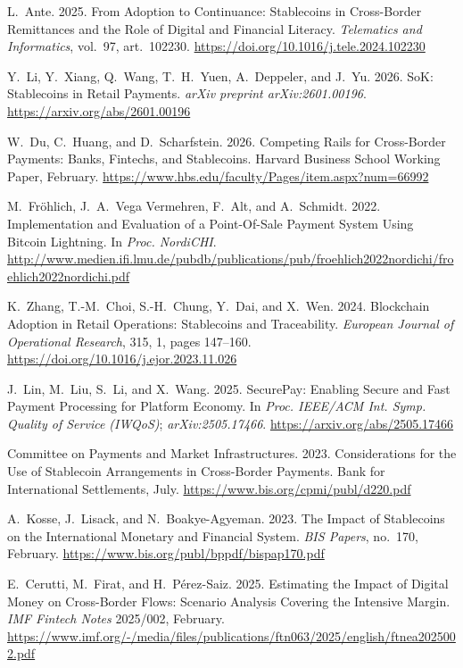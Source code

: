 \documentclass[12pt,a4paper]{report}
\begin{document}
{\begin{enumerate}[label={[\arabic*]}]
\item L.~Ante. 2025. From Adoption to Continuance: Stablecoins in Cross-Border Remittances and the Role of Digital and Financial Literacy. \emph{Telematics and Informatics}, vol.~97, art.~102230. \url{https://doi.org/10.1016/j.tele.2024.102230}


\item Y.~Li, Y.~Xiang, Q.~Wang, T.~H.~Yuen, A.~Deppeler, and J.~Yu. 2026. SoK: Stablecoins in Retail Payments. \emph{arXiv preprint arXiv:2601.00196}. \url{https://arxiv.org/abs/2601.00196}


\item W.~Du, C.~Huang, and D.~Scharfstein. 2026. Competing Rails for Cross-Border Payments: Banks, Fintechs, and Stablecoins. Harvard Business School Working Paper, February. \url{https://www.hbs.edu/faculty/Pages/item.aspx?num=66992}


\item M.~Fr\"{o}hlich, J.~A.~Vega Vermehren, F.~Alt, and A.~Schmidt. 2022. Implementation and Evaluation of a Point-Of-Sale Payment System Using Bitcoin Lightning. In \emph{Proc. NordiCHI}. \url{http://www.medien.ifi.lmu.de/pubdb/publications/pub/froehlich2022nordichi/froehlich2022nordichi.pdf}


\item K.~Zhang, T.-M.~Choi, S.-H.~Chung, Y.~Dai, and X.~Wen. 2024. Blockchain Adoption in Retail Operations: Stablecoins and Traceability. \emph{European Journal of Operational Research}, 315, 1, pages 147--160. \url{https://doi.org/10.1016/j.ejor.2023.11.026}


\item J.~Lin, M.~Liu, S.~Li, and X.~Wang. 2025. SecurePay: Enabling Secure and Fast Payment Processing for Platform Economy. In \emph{Proc. IEEE/ACM Int. Symp. Quality of Service (IWQoS)}; \emph{arXiv:2505.17466}. \url{https://arxiv.org/abs/2505.17466}


\item Committee on Payments and Market Infrastructures. 2023. Considerations for the Use of Stablecoin Arrangements in Cross-Border Payments. Bank for International Settlements, July. \url{https://www.bis.org/cpmi/publ/d220.pdf}


\item A.~Kosse, J.~Lisack, and N.~Boakye-Agyeman. 2023. The Impact of Stablecoins on the International Monetary and Financial System. \emph{BIS Papers}, no.~170, February. \url{https://www.bis.org/publ/bppdf/bispap170.pdf}


\item E.~Cerutti, M.~Firat, and H.~P\'{e}rez-Saiz. 2025. Estimating the Impact of Digital Money on Cross-Border Flows: Scenario Analysis Covering the Intensive Margin. \emph{IMF Fintech Notes} 2025/002, February. \url{https://www.imf.org/-/media/files/publications/ftn063/2025/english/ftnea2025002.pdf}



\end{enumerate}}
\end{document}
